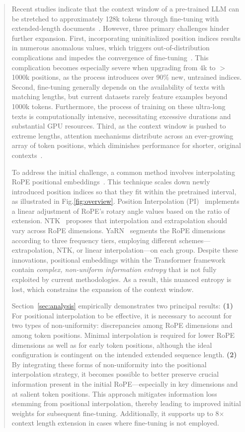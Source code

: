 \begin{abstract}
Recent studies indicate that the context window of a pre-trained LLM can be stretched to approximately 128k tokens through fine-tuning with extended-length documents~\cite{longlora,pi,yarn,zhang2024soaring,liu2023scaling}. However, three primary challenges hinder further expansion. First, incorporating uninitialized position indices results in numerous anomalous values, which triggers out-of-distribution complications and impedes the convergence of fine-tuning~\cite{pi}. This complication becomes especially severe when upgrading from 4k to $>$1000k positions, as the process introduces over 90\% new, untrained indices. Second, fine-tuning generally depends on the availability of texts with matching lengths, but current datasets rarely feature examples beyond 1000k tokens. Furthermore, the process of training on these ultra-long texts is computationally intensive, necessitating excessive durations and substantial GPU resources. Third, as the context window is pushed to extreme lengths, attention mechanisms distribute across an ever-growing array of token positions, which diminishes performance for shorter, original contexts~\cite{pi}.

To address the initial challenge, a common method involves interpolating RoPE positional embeddings~\cite{rope,pi}. This technique scales down newly introduced position indices so that they fit within the pretrained interval, as illustrated in Fig.\ref{fig:overview}. Position Interpolation (PI)~\cite{pi} implements a linear adjustment of RoPE's rotary angle values based on the ratio of extension. NTK~\cite{ntk,dynamicntk} proposes that interpolation and extrapolation should vary across RoPE dimensions. YaRN~\cite{yarn} segments the RoPE dimensions according to three frequency tiers, employing different schemes—extrapolation, NTK, or linear interpolation—on each group. Despite these innovations, positional embeddings within the Transformer framework contain \emph{complex, non-uniform information entropy} that is not fully exploited by current methodologies. As a result, this nuanced entropy is lost, which constrains the expansion of the context window.

Section~\ref{sec:analysis} empirically demonstrates two principal results: \textbf{(1)} For positional interpolation to be effective, it is necessary to account for two types of non-uniformity: discrepancies among RoPE dimensions and among token positions. Minimal interpolation is required for lower RoPE dimensions as well as for early token positions, although the ideal configuration is contingent on the intended extended sequence length. \textbf{(2)} By integrating these forms of non-uniformity into the positional interpolation strategy, it becomes possible to better preserve crucial information present in the initial RoPE—especially in key dimensions and at salient token positions. This approach mitigates information loss stemming from positional interpolation, thereby leading to improved initial weights for subsequent fine-tuning. Additionally, it supports up to 8$\times$ context length extension in cases where fine-tuning is not employed.


\end{abstract}
